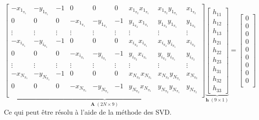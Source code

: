 \documentclass[../CSC_5RO17_TA_TP1.tex]{subfiles}
\begin{document}
\begin{equation}
    \underbrace{
        \begin{bmatrix}
            -x_{1_{\pi_1}} & -y_{1_{\pi_1}} & -1 & 0 & 0 & 0 & x_{1_{\pi_2}}x_{1_{\pi_1}} & x_{1_{\pi_2}}y_{1_{\pi_1}} & x_{1_{\pi_2}}\\
            0 & 0 & 0 & -x_{1_{\pi_1}} & -y_{1_{\pi_1}} & -1 & y_{1_{\pi_2}}x_{1_{\pi_1}} & y_{1_{\pi_2}}y_{1_{\pi_1}} & y_{1_{\pi_2}}\\
            \vdots&\vdots&\vdots&\vdots&\vdots&\vdots&\vdots&\vdots&\vdots\\
            -x_{i_{\pi_1}} & -y_{i_{\pi_1}} & -1 & 0 & 0 & 0 & x_{i_{\pi_2}}x_{i_{\pi_1}} & x_{i_{\pi_2}}y_{i_{\pi_1}} & x_{i_{\pi_2}}\\
            0 & 0 & 0 & -x_{i_{\pi_1}} & -y_{i_{\pi_1}} & -1 & y_{i_{\pi_2}}x_{i_{\pi_1}} & y_{i_{\pi_2}}y_{i_{\pi_1}} & y_{i_{\pi_2}}\\
            \vdots&\vdots&\vdots&\vdots&\vdots&\vdots&\vdots&\vdots&\vdots\\
            -x_{N_{\pi_1}} & -y_{N_{\pi_1}} & -1 & 0 & 0 & 0 & x_{N_{\pi_2}}x_{N_{\pi_1}} & x_{N_{\pi_2}}y_{N_{\pi_1}} & x_{N_{\pi_2}}\\
            0 & 0 & 0 & -x_{N_{\pi_1}} & -y_{N_{\pi_1}} & -1 & y_{N_{\pi_2}}x_{N_{\pi_1}} & y_{N_{\pi_2}}y_{N_{\pi_1}} & y_{N_{\pi_2}}\\
        \end{bmatrix}
    }_{\mathbf{A}\;(2N\times9)}
    \underbrace{
        \begin{bmatrix}
            h_{11}\\h_{12}\\h_{13}\\h_{21}\\h_{22}\\h_{23}\\h_{31}\\h_{32}\\h_{33}
        \end{bmatrix}
    }_{\mathbf{h}\;(9\times1)}
    =
    \begin{bmatrix}
        0\\0\\0\\0\\0\\0\\0\\0\\0\\
    \end{bmatrix}
\end{equation}
Ce qui peut être résolu à l'aide de la méthode des SVD.
\begin{scriptsize}\mycode
    
\end{scriptsize}
\end{document}
